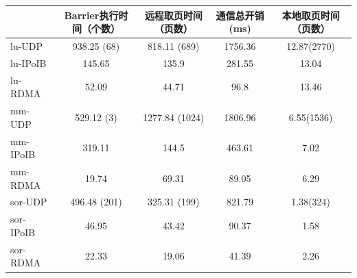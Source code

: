 {    \begin{table}[!htbp]
        \footnotesize%
        \setlength{\tabcolsep}{4pt}%
        \renewcommand{\arraystretch}{1.5}%
        \centering
        \label{tab:type2-time}
        \begin{tabular}{l|c|c|c|c}
            \hline
                      & Barrier执行时间（个数） & 远程取页时间（页数）     & 通信总开销(ms) & 本地取页时间（页数）  \\
            \hline
            lu-UDP    & 938.25 (68)     & 818.11 (689)   & 1756.36   & 12.87(2770) \\
            lu-IPoIB  & 145.65          & 135.9          & 281.55    & 13.04       \\
            lu-RDMA   & 52.09           & 44.71          & 96.8      & 13.46       \\
            \hline
            mm-UDP    & 529.12 (3)      & 1277.84 (1024) & 1806.96   & 6.55(1536)  \\
            mm-IPoIB  & 319.11          & 144.5          & 463.61    & 7.02        \\
            mm-RDMA   & 19.74           & 69.31          & 89.05     & 6.29        \\
            \hline
            sor-UDP   & 496.48 (201)    & 325.31 (199)   & 821.79    & 1.38(324)   \\
            sor-IPoIB & 46.95           & 43.42          & 90.37     & 1.58        \\
            sor-RDMA  & 22.33           & 19.06          & 41.39     & 2.26        \\
            \hline
        \end{tabular}
    \end{table}




}

